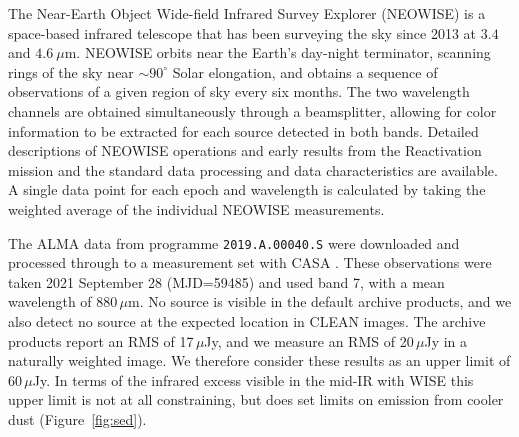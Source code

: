 \documentclass[sn-nature]{sn-jnl}%
\begin{document}



The Near-Earth Object Wide-field Infrared Survey Explorer (NEOWISE) is a space-based infrared telescope that has been surveying the sky since 2013 at $3.4$ and $4.6~\mu$m.
%
NEOWISE orbits near the Earth's day-night terminator, scanning rings of the sky near $\sim90^\circ$ Solar elongation, and obtains a sequence of observations of a given region of sky every six months.
%
The two wavelength channels are obtained simultaneously through a beamsplitter, allowing for color information to be extracted for each source detected in both bands.
%
Detailed descriptions of NEOWISE operations and early results from the Reactivation mission \cite{mainzer14neowise} and the standard data processing and data characteristics \cite{cutri15} are available.
%
A single data point for each epoch and wavelength is calculated by taking the weighted average of the individual NEOWISE measurements.



The ALMA data from programme \texttt{2019.A.00040.S} were downloaded and processed through to a measurement set with CASA \cite{2007ASPC..376..127M}.
%
These observations were taken 2021 September 28 (MJD=59485) and used band 7, with a mean wavelength of 880\,$\mu$m.
%
No source is visible in the default archive products, and we also detect no source at the expected location in CLEAN images.
%
The archive products report an RMS of 17\,$\mu$Jy, and we measure an RMS of 20\,$\mu$Jy in a naturally weighted image.
%
We therefore consider these results as an upper limit of 60\,$\mu$Jy.
%
In terms of the infrared excess visible in the mid-IR with WISE this upper limit is not at all constraining, but does set limits on emission from cooler dust (Figure~\ref{fig:sed}).
%
\end{document}
